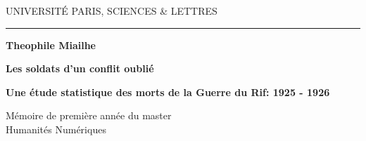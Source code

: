 \begin{titlepage}
\begin{center}

\bigskip

\begin{large}
UNIVERSITÉ PARIS, SCIENCES \& LETTRES
\end{large}

\begin{center}\rule{2cm}{0.02cm}\end{center}

\bigskip
\bigskip
\bigskip
\begin{Large}
\textbf{Theophile Miailhe}\\
\end{Large}
\begin{normalsize}
\end{normalsize}

\bigskip
\bigskip
\bigskip

\begin{Huge}
\textbf{Les soldats d'un conflit oublié}\\
\end{Huge}

\bigskip
\bigskip
\begin{LARGE}
\textbf{Une étude statistique des morts de la Guerre du Rif: 1925 - 1926}\\
\end{LARGE}

\bigskip
\bigskip
\bigskip
\vfill

\begin{large}
Mémoire de première année du master\\
\og Humanités Numériques \fg{} \\
\end{large}

\end{center}
\end{titlepage}
